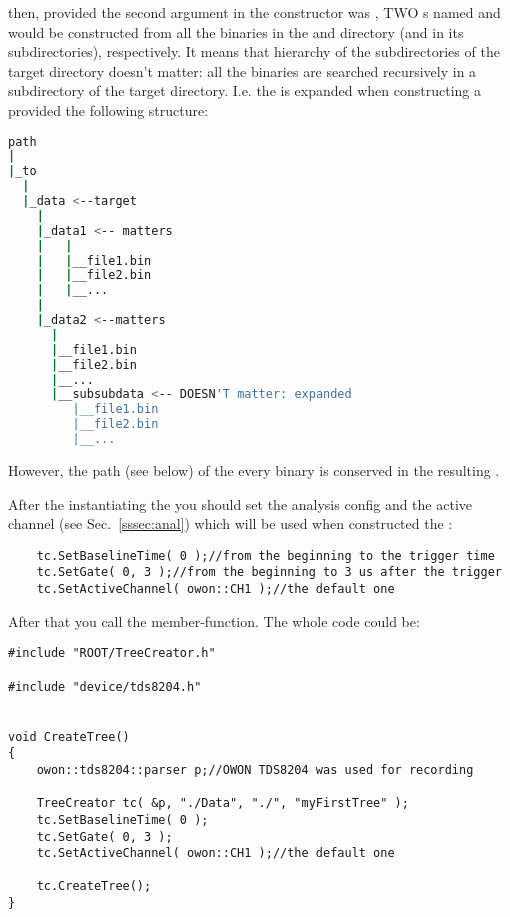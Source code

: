 then, provided the second argument in the  constructor
was , TWO s named  and
 would be constructed from all the binaries in the  and
 directory (and in its subdirectories), respectively.
It means that hierarchy of the subdirectories of the target directory doesn't matter:
all the binaries are searched recursively in a subdirectory of the target directory. I.e.
the  is expanded when constructing a  provided the following
structure:
\begin{lstlisting}[language=bash]
path
|
|_to
  |
  |_data <--target
    |
    |_data1 <-- matters
    |   | 
    |   |__file1.bin
    |   |__file2.bin
    |   |__...
    |
    |_data2 <--matters
      |
      |__file1.bin
      |__file2.bin
      |__...
      |__subsubdata <-- DOESN'T matter: expanded
         |__file1.bin
         |__file2.bin
         |__...
\end{lstlisting}
However, the path (see below) of the every binary is conserved in the resulting
.

After the instantiating the  you should set the analysis config and
the active channel
(see Sec.~\ref{sssec:anal}) which will be used when constructed the :
\begin{lstlisting}
    tc.SetBaselineTime( 0 );//from the beginning to the trigger time
    tc.SetGate( 0, 3 );//from the beginning to 3 us after the trigger
    tc.SetActiveChannel( owon::CH1 );//the default one
\end{lstlisting}


After that you call the  member-function. The whole code could be:

\begin{lstlisting}
#include "ROOT/TreeCreator.h"

#include "device/tds8204.h"


void CreateTree()
{
    owon::tds8204::parser p;//OWON TDS8204 was used for recording

    TreeCreator tc( &p, "./Data", "./", "myFirstTree" );
    tc.SetBaselineTime( 0 );
    tc.SetGate( 0, 3 );
    tc.SetActiveChannel( owon::CH1 );//the default one

    tc.CreateTree();
}
\end{lstlisting}

